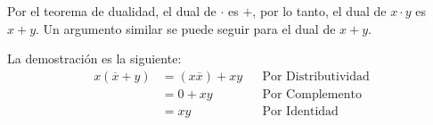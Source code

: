 \documentclass[answers]{exam}
\begin{document}
\begin{questions}
  \begin{solution}
    Por el teorema de dualidad, el dual de $\cdot$ es $+$, por lo tanto, el dual de
    $x \cdot y$ es $x+y$. Un argumento similar se puede seguir para el dual de
    $x+y$.
  \end{solution}

  \begin{solution}
    La demostración es la siguiente:
    \begin{align*}
      x(\overline{x} + y) &= (x\overline{x}) + xy && \text{Por Distributividad} \\
                          &= 0 + xy && \text{Por Complemento} \\
                          &= xy && \text{Por Identidad}
    \end{align*}
  \end{solution}


\end{questions}
\end{document}

